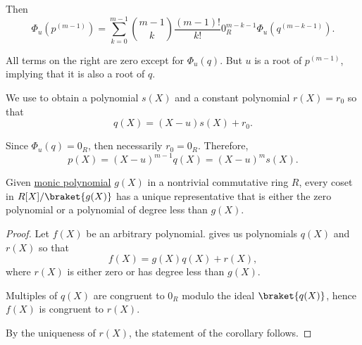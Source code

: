 \begin{defproof}
  Then
  \begin{equation*}
    \Phi_u(p^{(m-1)}) = \sum_{k=0}^{m-1} \binom {m-1} k \frac {(m - 1)!} {k!} 0_R^{m - k - 1} \Phi_u(q^{(m - k - 1)}).
  \end{equation*}

  All terms on the right are zero except for \( \Phi_u(q) \). But \( u \) is a root of \( p^{(m-1)} \), implying that it is also a root of \( q \).

  We use  to obtain a polynomial \( s(X) \) and a constant polynomial \( r(X) = r_0 \) so that
  \begin{equation*}
    q(X) = (X - u) s(X) + r_0.
  \end{equation*}

  Since \( \Phi_u(q) = 0_R \), then necessarily \( r_0 = 0_R \). Therefore,
  \begin{equation*}
    p(X) = (X - u)^{m-1} q(X) = (X - u)^m s(X).
  \end{equation*}
\end{defproof}

\begin{proposition}\label{thm:representatives_in_univariate_polynomial_quotient_set}
  Given \hyperref[def:monic_polynomial]{monic polynomial} \( g(X) \) in a nontrivial commutative ring \( R \), every coset in \( R[X] / \braket{ g(X) } \) has a unique representative that is either the zero polynomial or a polynomial of degree less than \( g(X) \).
\end{proposition}
\begin{proof}
  Let \( f(X) \) be an arbitrary polynomial.  gives us polynomials \( q(X) \) and \( r(X) \) so that
  \begin{equation*}
    f(X) = g(X) q(X) + r(X),
  \end{equation*}
  where \( r(X) \) is either zero or has degree less than \( g(X) \).

  Multiples of \( q(X) \) are congruent to \( 0_R \) modulo the ideal \( \braket{ q(X) } \), hence \( f(X) \) is congruent to \( r(X) \).

  By the uniqueness of \( r(X) \), the statement of the corollary follows.
\end{proof}

